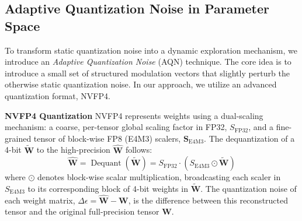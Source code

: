 \subsection{Adaptive Quantization Noise in Parameter Space}

To transform static quantization noise into a dynamic exploration mechanism, we introduce an \textit{Adaptive Quantization Noise} (AQN) technique. The core idea is to introduce a small set of structured modulation vectors that slightly perturb the otherwise static quantization noise. In our approach, we utilize an advanced quantization format, NVFP4.

\textbf{NVFP4 Quantization} NVFP4 represents weights using a dual-scaling mechanism: a coarse, per-tensor global scaling factor in FP32, $S_{\text{FP32}}$, and a fine-grained tensor of block-wise FP8 (E4M3) scalers, $\mathbf{S}_{\text{E4M3}}$. The dequantization of a 4-bit $\tilde{\mathbf{W}}$ to the high-precision $\hat{\mathbf{W}}$ follows:
\begin{equation}\label{eq:nvfp4_dequant}
\hat{\mathbf{W}} = \operatorname{Dequant}(\tilde{\mathbf{W}}) = S_{\text{FP32}} \cdot (S_{\text{E4M3}} \odot \tilde{\mathbf{W}})
\end{equation}
where $\odot$ denotes block-wise scalar multiplication, broadcasting each scaler in $S_{\text{E4M3}}$ to its corresponding block of 4-bit weights in $\tilde{\mathbf{W}}$. The quantization noise of each weight matrix, $\Delta\epsilon= \hat{\mathbf{W}} - \mathbf{W}$, is the difference between this reconstructed tensor and the original full-precision tensor $\mathbf{W}$.


